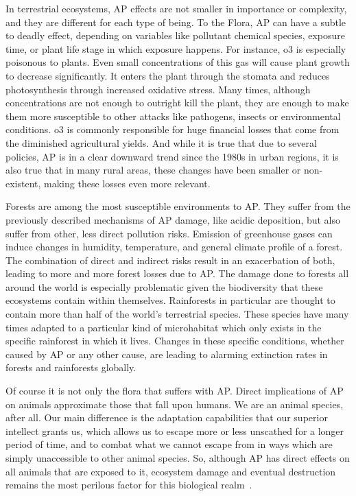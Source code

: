 In terrestrial ecosystems, \gls{AP} effects are not smaller in
importance or complexity, and they are different for each type of being.
To the Flora, \gls{AP} can have a subtle to deadly effect, depending on
variables like pollutant chemical species, exposure time, or plant life
stage in which exposure happens. For instance, \gls{o3} is especially
poisonous to plants. Even small concentrations of this gas will cause
plant growth to decrease significantly. It enters the plant through the
stomata and reduces photosynthesis through increased oxidative stress.
Many times, although concentrations are not enough to outright kill the
plant, they are enough to make them more susceptible to other attacks
like pathogens, insects or environmental conditions. \acrlong{o3} is
commonly responsible for huge financial losses that come from the
diminished agricultural yields. And while it is true that due to several
policies, \gls{AP} is in a clear downward trend since the 1980s in urban
regions, it is also true that in many rural areas, these changes have
been smaller or non-existent, making these losses even more relevant.

Forests are among the most susceptible environments to \gls{AP}. They
suffer from the previously described mechanisms of \gls{AP} damage, like
acidic deposition, but also suffer from other, less direct pollution
risks. Emission of greenhouse gases can induce changes in humidity,
temperature, and general climate profile of a forest. The combination of
direct and indirect risks result in an exacerbation of both, leading to
more and more forest losses due to \acrlong{AP}. The damage done to
forests all around the world is especially problematic given the
biodiversity that these ecosystems contain within themselves.
Rainforests in particular are thought to contain more than half of the
world's terrestrial species. These species have many times adapted to a
particular kind of microhabitat which only exists in the specific
rainforest in which it lives. Changes in these specific conditions,
whether caused by \acrlong{AP} or any other cause, are leading to
alarming extinction rates in forests and rainforests globally.

Of course it is not only the flora that suffers with \acrlong{AP}.
Direct implications of \gls{AP} on animals approximate those that fall
upon humans. We are an animal species, after all. Our main difference is
the adaptation capabilities that our superior intellect grants us, which
allows us to escape more or less unscathed for a longer period of time,
and to combat what we cannot escape from in ways which are simply
unaccessible to other animal species. So, although \gls{AP} has direct
effects on all animals that are exposed to it, ecosystem damage and
eventual destruction remains the most perilous factor for this
biological realm~.





